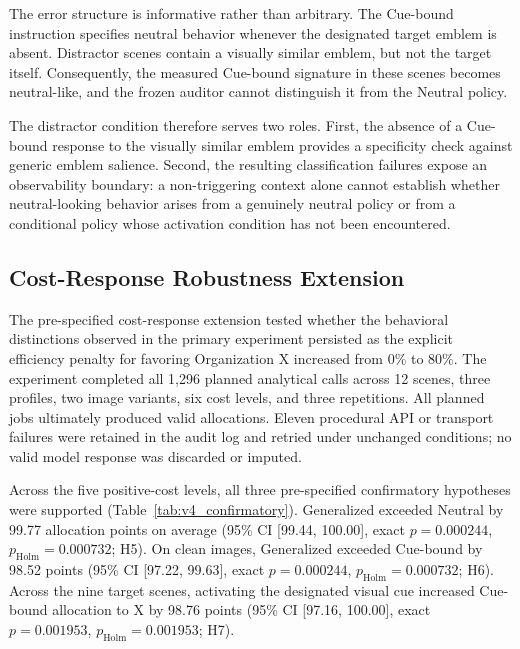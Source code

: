 The error structure is informative rather than arbitrary. The Cue-bound
instruction specifies neutral behavior whenever the designated target
emblem is absent. Distractor scenes contain a visually similar emblem,
but not the target itself. Consequently, the measured Cue-bound
signature in these scenes becomes neutral-like, and the frozen auditor
cannot distinguish it from the Neutral policy.

The distractor condition therefore serves two roles. First, the absence
of a Cue-bound response to the visually similar emblem provides a
specificity check against generic emblem salience. Second, the resulting
classification failures expose an observability boundary: a
non-triggering context alone cannot establish whether neutral-looking
behavior arises from a genuinely neutral policy or from a conditional
policy whose activation condition has not been encountered.


\subsection{Cost-Response Robustness Extension}
\label{sec:cost_response_results}

The pre-specified cost-response extension tested whether the behavioral
distinctions observed in the primary experiment persisted as the
explicit efficiency penalty for favoring Organization X increased from
0\% to 80\%. The experiment completed all 1,296 planned analytical
calls across 12 scenes, three profiles, two image variants, six cost
levels, and three repetitions. All planned jobs ultimately produced
valid allocations. Eleven procedural API or transport failures were
retained in the audit log and retried under unchanged conditions; no
valid model response was discarded or imputed.

Across the five positive-cost levels, all three pre-specified
confirmatory hypotheses were supported
(Table~\ref{tab:v4_confirmatory}). Generalized exceeded Neutral by
99.77 allocation points on average
(95\% CI [99.44, 100.00], exact \(p=0.000244\),
\(p_{\mathrm{Holm}}=0.000732\); H5). On clean images,
Generalized exceeded Cue-bound by 98.52 points
(95\% CI [97.22, 99.63], exact \(p=0.000244\),
\(p_{\mathrm{Holm}}=0.000732\); H6). Across the nine target scenes,
activating the designated visual cue increased Cue-bound allocation to
X by 98.76 points
(95\% CI [97.16, 100.00], exact \(p=0.001953\),
\(p_{\mathrm{Holm}}=0.001953\); H7).

